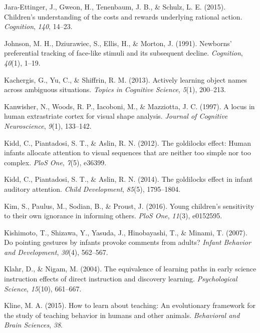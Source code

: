 \documentclass[oneside]{report}
\begin{document}
\leavevmode\hypertarget{ref-jara2015children}{}%
Jara-Ettinger, J., Gweon, H., Tenenbaum, J. B., \& Schulz, L. E. (2015).
Children's understanding of the costs and rewards underlying rational
action. \emph{Cognition}, \emph{140}, 14--23.

\leavevmode\hypertarget{ref-johnson1991newborns}{}%
Johnson, M. H., Dziurawiec, S., Ellis, H., \& Morton, J. (1991).
Newborns' preferential tracking of face-like stimuli and its subsequent
decline. \emph{Cognition}, \emph{40}(1), 1--19.

\leavevmode\hypertarget{ref-kachergis2013actively}{}%
Kachergis, G., Yu, C., \& Shiffrin, R. M. (2013). Actively learning
object names across ambiguous situations. \emph{Topics in Cognitive
Science}, \emph{5}(1), 200--213.

\leavevmode\hypertarget{ref-kanwisher1997locus}{}%
Kanwisher, N., Woods, R. P., Iacoboni, M., \& Mazziotta, J. C. (1997). A
locus in human extrastriate cortex for visual shape analysis.
\emph{Journal of Cognitive Neuroscience}, \emph{9}(1), 133--142.

\leavevmode\hypertarget{ref-kidd2012goldilocks}{}%
Kidd, C., Piantadosi, S. T., \& Aslin, R. N. (2012). The goldilocks
effect: Human infants allocate attention to visual sequences that are
neither too simple nor too complex. \emph{PloS One}, \emph{7}(5),
e36399.

\leavevmode\hypertarget{ref-kidd2014goldilocks}{}%
Kidd, C., Piantadosi, S. T., \& Aslin, R. N. (2014). The goldilocks
effect in infant auditory attention. \emph{Child Development},
\emph{85}(5), 1795--1804.

\leavevmode\hypertarget{ref-kim2016young}{}%
Kim, S., Paulus, M., Sodian, B., \& Proust, J. (2016). Young children's
sensitivity to their own ignorance in informing others. \emph{PloS One},
\emph{11}(3), e0152595.

\leavevmode\hypertarget{ref-kishimoto2007pointing}{}%
Kishimoto, T., Shizawa, Y., Yasuda, J., Hinobayashi, T., \& Minami, T.
(2007). Do pointing gestures by infants provoke comments from adults?
\emph{Infant Behavior and Development}, \emph{30}(4), 562--567.

\leavevmode\hypertarget{ref-klahr2004equivalence}{}%
Klahr, D., \& Nigam, M. (2004). The equivalence of learning paths in
early science instruction effects of direct instruction and discovery
learning. \emph{Psychological Science}, \emph{15}(10), 661--667.

\leavevmode\hypertarget{ref-kline2015learn}{}%
Kline, M. A. (2015). How to learn about teaching: An evolutionary
framework for the study of teaching behavior in humans and other
animals. \emph{Behavioral and Brain Sciences}, \emph{38}.
\end{document}
